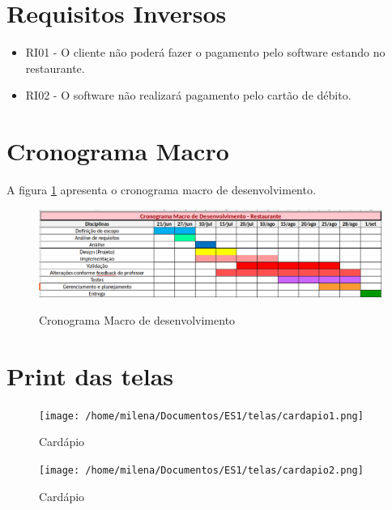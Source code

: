 \documentclass[12pt, a4paper]{article}
\begin{document}
\section{Requisitos Inversos}
\begin{itemize}
	\item RI01 - O cliente não poderá fazer o pagamento pelo software estando no restaurante.
	\item RI02 - O software não realizará pagamento pelo cartão de débito.	
\end{itemize}

\section{Cronograma Macro}
A figura \ref{cronograma} apresenta o cronograma macro de desenvolvimento.
\begin{figure}[!t]
	\caption{Cronograma Macro de desenvolvimento}
	
	\centering %
	\includegraphics[width=6in]{cronograma.png} %
	\label{cronograma}
	
\end{figure}

\section{Print das telas}
\begin{figure}[htb]
	\caption{Cardápio}
	
	\centering %
	\texttt{[image: /home/milena/Documentos/ES1/telas/cardapio1.png]} %
	
\end{figure}

\begin{figure}[htb]
	\caption{Cardápio}
	
	\centering %
	\texttt{[image: /home/milena/Documentos/ES1/telas/cardapio2.png]} %
	
\end{figure}
\end{document}
